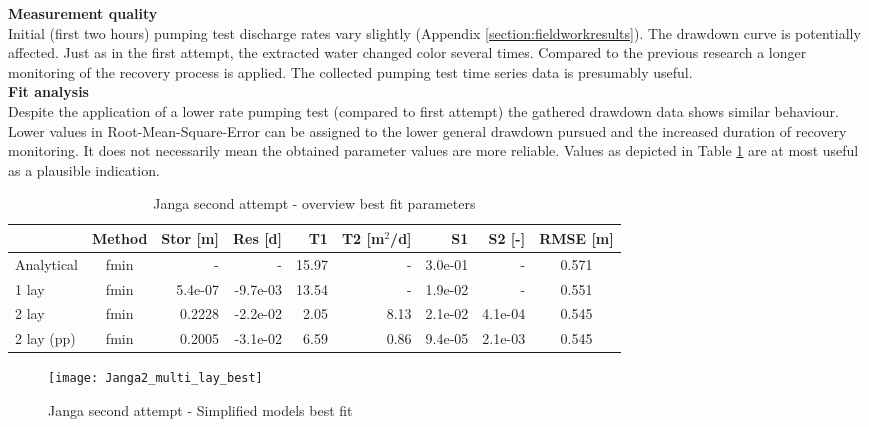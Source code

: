 \textbf{Measurement quality} \\
Initial (first two hours) pumping test discharge rates vary slightly (Appendix \ref{section:fieldworkresults}). The drawdown curve is potentially affected. Just as in the first attempt, the extracted water changed color several times. Compared to the previous research a longer monitoring of the recovery process is applied. The collected pumping test time series data is presumably useful. \\

\textbf{Fit analysis} \\
Despite the application of a lower rate pumping test (compared to first attempt) the  gathered drawdown data shows similar behaviour. Lower values in Root-Mean-Square-Error can be assigned to the lower general drawdown pursued and the increased duration of recovery monitoring. It does not necessarily mean the obtained parameter values are more reliable. Values as depicted in Table \ref{tab:Janga2_table} are at most useful as a plausible indication. 

\begin{table}[h!]
\small
\centering
\caption{Janga second attempt - overview best fit parameters}
\label{tab:Janga2_table}
\begin{tabular}{l|c|r|r|rr|rr|c}
\hline 
\textbf{}       & \textbf{Method} & \textbf{Stor [m]} & \textbf{Res [d]} & \textbf{T1}  & \textbf{T2   [m$^2$/d]}  & \textbf{S1}  & \textbf{S2 [-]}  & \textbf{RMSE [m]} \\ \hline \hline
Analytical                & fmin             & -             & -            & 15.97      & -          & 3.0e-01    & -          & 0.571 \\
1 lay                     & fmin             & 5.4e-07       & -9.7e-03     & 13.54      & -          & 1.9e-02    & -          & 0.551 \\
2 lay                     & fmin             & 0.2228        & -2.2e-02     & 2.05       & 8.13       & 2.1e-02    & 4.1e-04    & 0.545 \\
2 lay (pp)                & fmin             & 0.2005        & -3.1e-02     & 6.59       & 0.86       & 9.4e-05    & 2.1e-03    & 0.545 \\ \hline    
\end{tabular}
\end{table}

\begin{figure}[h!]
 \centering
 \texttt{[image: Janga2\_multi\_lay\_best]}
 \captionsetup{justification=centering} 
 \caption{Janga second attempt - Simplified models best fit}
 \label{fig:Janga2_best}
\end{figure}


